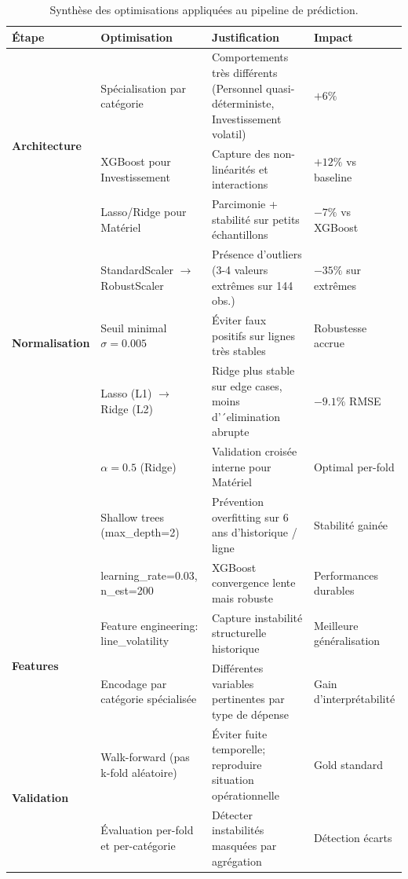 \begin{table}[H]
\centering\footnotesize
\setlength{\tabcolsep}{4pt}
\caption{Synth\`ese des optimisations appliqu\'ees au pipeline de pr\'ediction.}
\label{tab:optimizations-summary}
\begin{tabular}{@{}p{2.6cm}p{4.2cm}p{5cm}p{2.6cm}@{}}
\toprule
\textbf{\'Etape} & \textbf{Optimisation} & \textbf{Justification} & \textbf{Impact} \\
\midrule
\multirow{3}{*}{\textbf{Architecture}} 
  & Sp\'ecialisation par cat\'egorie & Comportements tr\`es diff\'erents (Personnel quasi-d\'eterministe, Investissement volatil) & $+6\%$ \\
  & XGBoost pour Investissement & Capture des non-lin\'earit\'es et interactions & $+12\%$ vs baseline \\
  & Lasso/Ridge pour Mat\'eriel & Parcimonie + stabilit\'e sur petits \'echantillons & $-7\%$ vs XGBoost \\
\midrule
\multirow{3}{*}{\textbf{Normalisation}}
  & StandardScaler $\rightarrow$ RobustScaler & Pr\'esence d'outliers (3-4 valeurs extr\^emes sur 144 obs.) & $-35\%$ sur extr\^emes \\
  & Seuil minimal $\sigma = 0.005$ & \'Eviter faux positifs sur lignes tr\`es stables & Robustesse accrue \\
\midrule
\multirow{4}{*}{\textbf{R\'egularisation}}
  & Lasso (L1) $\rightarrow$ Ridge (L2) & Ridge plus stable sur edge cases, moins d'´elimination abrupte & $-9.1\%$ RMSE \\
  & $\alpha = 0.5$ (Ridge) & Validation crois\'ee interne pour Mat\'eriel & Optimal per-fold \\
  & Shallow trees (max\_depth=2) & Pr\'evention overfitting sur 6 ans d'historique / ligne & Stabilit\'e gain\'ee \\
  & learning\_rate=0.03, n\_est=200 & XGBoost convergence lente mais robuste & Performances durables \\
\midrule
\multirow{2}{*}{\textbf{Features}}
  & Feature engineering: line\_volatility & Capture instabilit\'e structurelle historique & Meilleure g\'en\'eralisation \\
  & Encodage par cat\'egorie sp\'ecialis\'ee & Diff\'erentes variables pertinentes par type de d\'epense & Gain d'interpr\'etabilit\'e \\
\midrule
\multirow{2}{*}{\textbf{Validation}}
  & Walk-forward (pas k-fold al\'eatoire) & \'Eviter fuite temporelle; reproduire situation op\'erationnelle & Gold standard \\
  & \'Evaluation per-fold et per-cat\'egorie & D\'etecter instabilit\'es masqu\'ees par agr\'egation & D\'etection \'ecarts \\
\bottomrule
\end{tabular}
\end{table}

